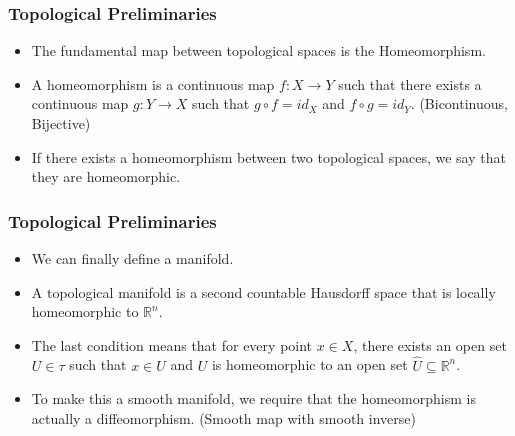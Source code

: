 \documentclass{beamer}
\begin{document}
\begin{frame}%

\frametitle{Topological Preliminaries}

\begin{itemize}

\item The fundamental map between topological spaces is the Homeomorphism.

\pause

\item A homeomorphism is a continuous map $f: X \to Y$ such that there exists a continuous map
  $g: Y \to X$ such that $g \circ f = id_X$ and $f \circ g = id_Y$. (Bicontinuous, Bijective)

\pause

\item If there exists a homeomorphism between two topological spaces, we say that they are
  homeomorphic.

\end{itemize}

\end{frame}
\begin{frame}%

\frametitle{Topological Preliminaries}

\begin{itemize}

\item We can finally define a manifold.

\pause

\item A topological manifold is a second countable Hausdorff space that is locally
  homeomorphic to $\mathbb{R}^n$.

\pause

\item The last condition means that for every point $x \in X$, there exists an open set $U \in \tau$
  such that $x \in U$ and $U$ is homeomorphic to an open set $\hat{U} \subseteq \mathbb{R}^n$.

\item To make this a smooth manifold, we require that the homeomorphism is actually a
  diffeomorphism. (Smooth map with smooth inverse)

\end{itemize}

\end{frame}

\end{document}
